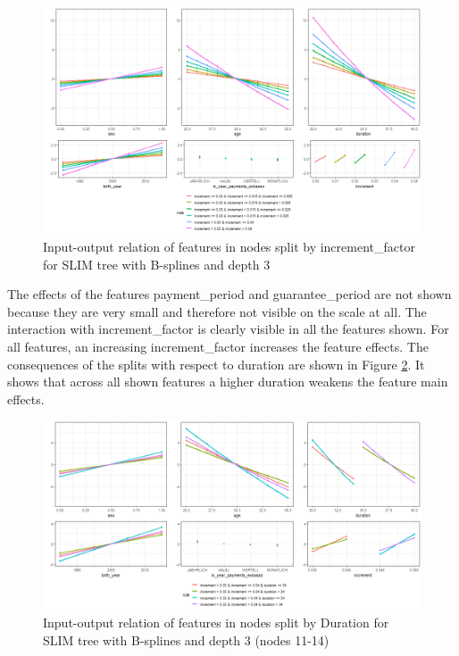\begin{figure}[!htb]
    \centering    
    \includegraphics[width=16cm]{Figures/insurance_use_case/k1_08_BPV/effects_increment_factor.png}
    \caption{Input-output relation of features in nodes split by increment\_factor for SLIM tree with B-splines and depth 3}
    \label{fig:ins_k108_effects_increment}
\end{figure}

The effects of the features payment\_period and guarantee\_period are not shown because they are very small and therefore not visible on the scale at all.
The interaction with increment\_factor is clearly visible in all the features shown. For all features, an increasing increment\_factor increases the feature effects.
The consequences of the splits with respect to duration are shown in Figure \ref{fig:ins_k108_effects_duration}. It shows that across all shown features a higher duration weakens the feature main effects.

\begin{figure}[!htb]
    \centering 
    \includegraphics[width=16cm]{Figures/insurance_use_case/k1_08_BPV/effects_duration.png}
    \caption{Input-output relation of features in nodes split by Duration for SLIM tree with B-splines and depth 3 (nodes 11-14)}
    \label{fig:ins_k108_effects_duration}
\end{figure}



